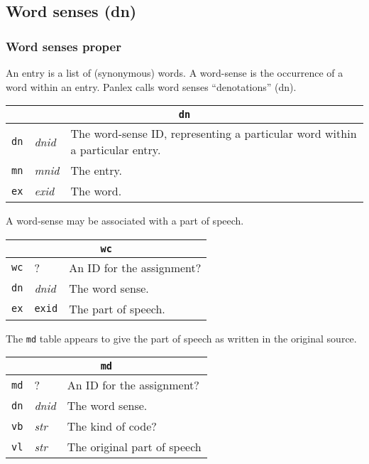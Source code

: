 \subsection{Word senses (dn)}

\subsubsection{Word senses proper}

An entry is a list of (synonymous) words.
A word-sense is the occurrence of a word within an entry.
Panlex calls word senses ``denotations'' (dn).

\begin{trivlist}\item
\begin{tabular}{|llp{3.5in}|}
\hline
\multicolumn{3}{|c|}{\tt dn}\\
\hline
{\tt dn} & {\it dnid} & The word-sense ID, representing a particular
    word within a particular entry.\\
{\tt mn} & {\it mnid} & The entry.\\
{\tt ex} & {\it exid} & The word.\\
\hline
\end{tabular}
\end{trivlist}
A word-sense may be associated with a part
of speech.
\begin{trivlist}\item
\begin{tabular}{|llp{3.5in}|}
\hline
\multicolumn{3}{|c|}{\tt wc}\\
\hline
{\tt wc} & ? & An ID for the assignment?\\
{\tt dn} & {\it dnid} & The word sense.\\
{\tt ex} & {\tt exid} & The part of speech.\\
\hline
\end{tabular}
\end{trivlist}

The {\tt md} table appears to give the part of speech as written
in the original source.

\begin{trivlist}\item
\begin{tabular}{|llp{3.5in}|}
\hline
\multicolumn{3}{|c|}{\tt md}\\
\hline
{\tt md} & ? & An ID for the assignment?\\
{\tt dn} & {\it dnid} & The word sense.\\
{\tt vb} & {\it str} & The kind of code?\\
{\tt vl} & {\it str} & The original part of speech\\
\hline
\end{tabular}
\end{trivlist}

